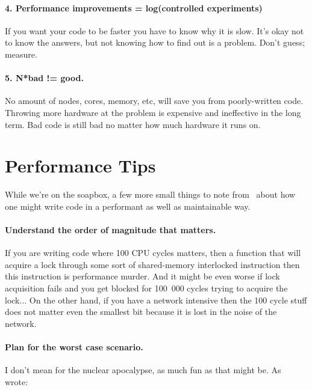 \paragraph{4. Performance improvements = log(controlled experiments)}
If you want your code to be faster you have to know why it is slow. It's okay not to know the answers, but not knowing how to find out is a problem. Don't guess; measure.


\paragraph{5. N*bad != good.}
No amount of nodes, cores, memory, etc, will save you from poorly-written code. Throwing more hardware at the problem is expensive and ineffective in the long term. Bad code is still bad no matter how much hardware it runs on. 

\section*{Performance Tips}

While we're on the soapbox, a few more small things to note from~\cite{preopt} about how one might write code in a performant as well as maintainable way.

\paragraph{Understand the order of magnitude that matters.} If you are writing code where 100 CPU cycles matters, then a function that will acquire a lock through some sort of shared-memory interlocked instruction then this instruction is performance murder. And it might be even worse if lock acquisition fails and you get blocked for 100~000 cycles trying to acquire the lock... On the other hand, if you have a network intensive then the 100 cycle stuff does not matter even the smallest bit because it is lost in the noise of the network.

\paragraph{Plan for the worst case scenario.} I don't mean for the nuclear apocalypse, as much fun as that might be. As~\cite{preopt} wrote:

